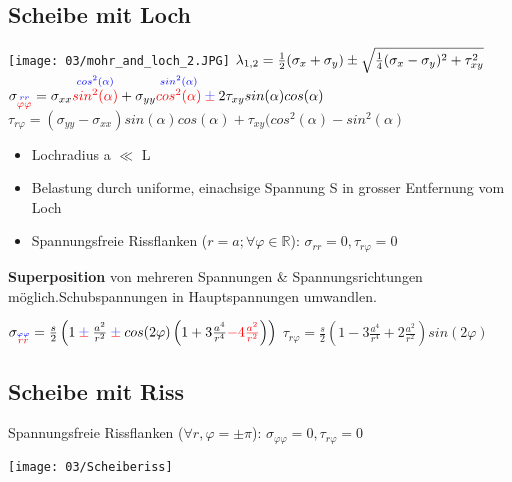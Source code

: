     \subsection{Scheibe mit Loch}
        \begin{center}
            \texttt{[image: 03/mohr\_and\_loch\_2.JPG]}
            $\tiny{\lambda_{1,2}= \frac{1}{2}(\sigma_x+\sigma_y)\pm\sqrt{\frac{1}{4}(\sigma_x-\sigma_y)^2+\tau_{xy}^2}}$\\
            $\sigma_{\overset{\textcolor{blue}{rr}}{\textcolor{red}{\varphi\varphi}}}=\sigma_{xx}\overset{\textcolor{blue}{cos^2(\alpha)}}{\textcolor{red}{sin^2(\alpha)}}+\sigma_{yy}\overset{\textcolor{blue}{sin^2(\alpha)}}{\textcolor{red}{cos^2(\alpha)}} \cpm 2\tau_{xy}sin(\alpha)cos(\alpha)$\\
            $\tau_{r\varphi}=(\sigma_{yy}-\sigma_{xx})sin(\alpha)cos(\alpha)+\tau_{xy}(cos^2(\alpha)-sin^2(\alpha)$
        \end{center}
\columnbreak
        \begin{itemize}
            \item Lochradius a $\ll$ L
            \item Belastung durch uniforme, einachsige Spannung S in grosser Entfernung vom Loch
            \item Spannungsfreie Rissflanken ($r = a; \forall\varphi\in\mathbb{R} $): $\sigma_{rr}=0, \tau_{r\varphi}=0$
        \end{itemize}
        \textbf{Superposition} von mehreren Spannungen \& Spannungsrichtungen möglich.Schubspannungen in Hauptspannungen umwandlen.
        \begin{center}
            $\sigma_{\overset{\textcolor{blue}{\varphi\varphi}}{\textcolor{red}{rr}}}=\frac{s}{2}\left(1\cpm\frac{a^2}{r^2}\cpm cos(2\varphi)\left(1+3\frac{a^4}{r^4}\textcolor{red}{-4\frac{a^2}{r^2}}\right)\right)$
            $\tau_{r\varphi}=\frac{s}{2}\left(1-3\frac{a^4}{r^4}+2\frac{a^2}{r^2}\right)sin(2\varphi)$
        \end{center}
        
    \subsection{Scheibe mit Riss}
        Spannungsfreie Rissflanken ($\forall r, \varphi=\pm\pi$): $\sigma_{\varphi\varphi}=0, \tau_{r\varphi}=0$
        \begin{center}
            \texttt{[image: 03/Scheiberiss]}
        \end{center}
\vspace{-2mm}
